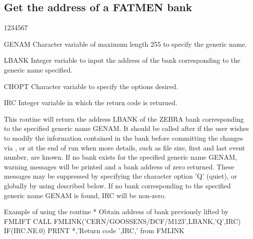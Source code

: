\subsection{Get the address of a FATMEN bank}
\begin{DLtt}{1234567}
\item[GENAM]
Character variable of maximum length 255 to specify the generic name.
\item[LBANK]
Integer variable to input the address of the bank corresponding
to the generic name specified.
\item[CHOPT]
Character variable to specify the options desired.
\item[IRC]
Integer variable in which the return code is returned.
\end{DLtt}
\par
This routine will return the address LBANK
of the ZEBRA bank corresponding
to the specified generic name GENAM. It should be called after 
if the user wishes to modify the information contained in the bank before
committing the changes via , or at the end of run when
more details, such as file size, first and last event number, are known.
If no bank exists for the specified generic name GENAM, warning messages
will be printed and a bank address of zero returned. These messages
may be suppressed by specifying the character option 'Q' (quiet), or
globally by using  described below.
If no bank corresponding to the specified generic name GENAM is found,
IRC will be non-zero.
\begin{XMPt}{Example of using the \protect{} routine}
*     Obtain address of bank previously lifted by FMLIFT
      CALL FMLINK('CERN/GOOSSENS/DCF/M123',LBANK,'Q',IRC)
      IF(IRC.NE.0) PRINT *,'Return code ',IRC,' from FMLINK
\end{XMPt}

